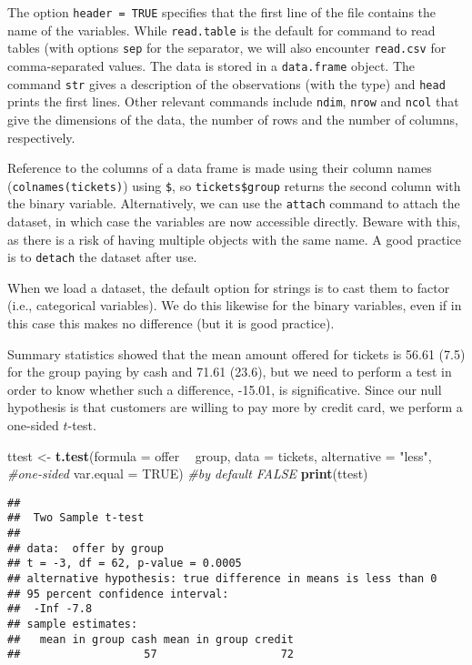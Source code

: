 \documentclass[
]{book}
\newenvironment{Shaded}{\begin{snugshade}}{\end{snugshade}}
\newcommand{\CommentTok}[1]{\textcolor[rgb]{0.56,0.35,0.01}{\textit{#1}}}
\newcommand{\DataTypeTok}[1]{\textcolor[rgb]{0.13,0.29,0.53}{#1}}
\newcommand{\KeywordTok}[1]{\textcolor[rgb]{0.13,0.29,0.53}{\textbf{#1}}}
\newcommand{\NormalTok}[1]{#1}
\newcommand{\OperatorTok}[1]{\textcolor[rgb]{0.81,0.36,0.00}{\textbf{#1}}}
\newcommand{\OtherTok}[1]{\textcolor[rgb]{0.56,0.35,0.01}{#1}}
\newcommand{\StringTok}[1]{\textcolor[rgb]{0.31,0.60,0.02}{#1}}
\begin{document}
The option \texttt{header\ =\ TRUE} specifies that the first line of the file contains the name of the variables. While \texttt{read.table} is the default for command to read tables (with options \texttt{sep} for the separator, we will also encounter \texttt{read.csv} for comma-separated values. The data is stored in a \texttt{data.frame} object. The command \texttt{str} gives a description of the observations (with the type) and \texttt{head} prints the first lines. Other relevant commands include \texttt{ndim}, \texttt{nrow} and \texttt{ncol} that give the dimensions of the data, the number of rows and the number of columns, respectively.

Reference to the columns of a data frame is made using their column names (\texttt{colnames(tickets)}) using \texttt{\$}, so \texttt{tickets\$group} returns the second column with the binary variable. Alternatively, we can use the \texttt{attach} command to attach the dataset, in which case the variables are now accessible directly. Beware with this, as there is a risk of having multiple objects with the same name. A good practice is to \texttt{detach} the dataset after use.

When we load a dataset, the default option for strings is to cast them to factor (i.e., categorical variables). We do this likewise for the binary variables, even if in this case this makes no difference (but it is good practice).

Summary statistics showed that the mean amount offered for tickets is 56.61 (7.5) for the group paying by cash and 71.61 (23.6), but we need to perform a test in order to know whether such a difference, -15.01, is significative. Since our null hypothesis is that customers are willing to pay more by credit card, we perform a one-sided \(t\)-test.

\begin{Shaded}
\begin{Highlighting}[]
\NormalTok{ttest <-}\StringTok{ }\KeywordTok{t.test}\NormalTok{(}\DataTypeTok{formula =}\NormalTok{ offer }\OperatorTok{~}\StringTok{ }\NormalTok{group, }
       \DataTypeTok{data =}\NormalTok{ tickets, }
       \DataTypeTok{alternative =} \StringTok{"less"}\NormalTok{, }\CommentTok{#one-sided}
       \DataTypeTok{var.equal =} \OtherTok{TRUE}\NormalTok{) }\CommentTok{#by default FALSE}
\KeywordTok{print}\NormalTok{(ttest)}
\end{Highlighting}
\end{Shaded}

\begin{verbatim}
## 
##  Two Sample t-test
## 
## data:  offer by group
## t = -3, df = 62, p-value = 0.0005
## alternative hypothesis: true difference in means is less than 0
## 95 percent confidence interval:
##  -Inf -7.8
## sample estimates:
##   mean in group cash mean in group credit 
##                   57                   72
\end{verbatim}
\end{document}
